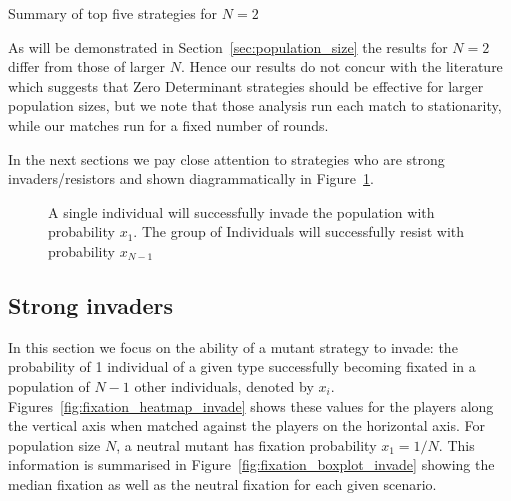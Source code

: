 \documentclass{article}
\begin{document}
\begin{table}[!hbtp]
    \centering
    
    \caption{Summary of top five strategies for \(N=2\)}
    \label{tbl:summary_top_2}
\end{table}

As will be demonstrated in Section~\ref{sec:population_size} the results for \(N=2\)
differ from those of larger $N$. Hence our results do not concur with the literature
which suggests that Zero Determinant strategies should be effective for larger population
sizes, but we note that those analysis run each match to stationarity, while
our matches run for a fixed number of rounds.

In the next sections we pay close attention to
strategies who are strong invaders/resistors and shown diagrammatically in
Figure~\ref{fig:invasion_resistance}.

\begin{figure}[!hbtp]
    \centering
    
    \caption{A single individual will successfully invade the population with
    probability \(x_1\). The group of Individuals will successfully resist with
    probability \(x_{N-1}\)}
    \label{fig:invasion_resistance}
\end{figure}

\subsection{Strong invaders}\label{sec:strong_invaders}

In this section we focus on the ability of a mutant strategy to invade: the
probability of 1 individual of a given type successfully becoming fixated in
a population of \(N - 1\) other individuals, denoted by \(x_i\).
Figures~\ref{fig:fixation_heatmap_invade} shows these values for
the players along the vertical axis when matched against the players on the
horizontal axis. For population size $N$, a neutral mutant has fixation
probability $x_1 = 1 / N$. This information is summarised in Figure~\ref{fig:fixation_boxplot_invade}
showing the median fixation as well as the neutral fixation for each given
scenario.
\end{document}
